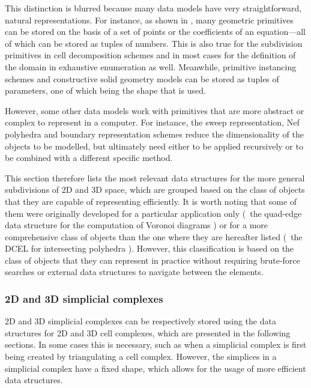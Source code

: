 This distinction is blurred because many data models have very straightforward, natural representations.
For instance, as shown in , many geometric primitives can be stored on the basis of a set of points or the coefficients of an equation---all of which can be stored as tuples of numbers.
This is also true for the subdivision primitives in cell decomposition schemes and in most cases for the definition of the domain in exhaustive enumeration as well.
Meanwhile, primitive instancing schemes and constructive solid geometry models can be stored as tuples of parameters, one of which being the shape that is used.

However, some other data models work with primitives that are more abstract or complex to represent in a computer.
For instance, the sweep representation, Nef polyhedra and boundary representation schemes reduce the dimensionality of the objects to be modelled, but ultimately need either to be applied recursively or to be combined with a different specific method.

This section therefore lists the most relevant data structures for the more general subdivisions of 2D and 3D space, which are grouped based on the class of objects that they are capable of representing efficiently.
It is worth noting that some of them were originally developed for a particular application only (\eg\ the quad-edge data structure for the computation of Voronoi diagrams \citep{Guibas85}) or for a more comprehensive class of objects than the one where they are hereafter listed (\eg\ the DCEL for intersecting polyhedra \citep{Muller78}).
However, this classification is based on the class of objects that they can represent in practice without requiring brute-force searches or external data structures to navigate between the elements.

\subsubsection{2D and 3D simplicial complexes}

2D and 3D simplicial complexes can be respectively stored using the data structures for 2D and 3D cell complexes, which are presented in the following sections.
In some cases this is necessary, such as when a simplicial complex is first being created by triangulating a cell complex.
However, the simplices in a simplicial complex have a fixed shape, which allows for the usage of more efficient data structures.


